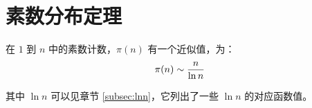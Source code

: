 \section{素数分布定理} \label{sec:素数分布定理}
在 $1$ 到 $n$ 中的素数计数，$\pi(n)$ 有一个近似值，为：\[
    \pi(n) \sim {n \over \ln n}
\]

其中 $\ln n$ 可以见章节 \ref{subsec:lnn}，它列出了一些 $\ln n$ 的对应函数值。

